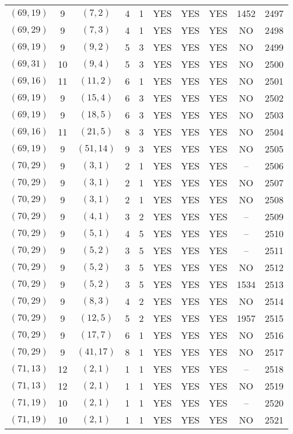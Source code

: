 \begin{longtable}{|c|c|c|c|c|c|c|c|c|c|}
$(69, 19)$ & 9 & $(7, 2)$ & 4 & 1 & YES & YES & YES & 1452 & 2497\\
$(69, 29)$ & 9 & $(7, 3)$ & 4 & 1 & YES & YES & YES & NO & 2498\\
$(69, 19)$ & 9 & $(9, 2)$ & 5 & 3 & YES & YES & YES & NO & 2499\\
$(69, 31)$ & 10 & $(9, 4)$ & 5 & 3 & YES & YES & YES & NO & 2500\\
$(69, 16)$ & 11 & $(11, 2)$ & 6 & 1 & YES & YES & YES & NO & 2501\\
$(69, 19)$ & 9 & $(15, 4)$ & 6 & 3 & YES & YES & YES & NO & 2502\\
$(69, 19)$ & 9 & $(18, 5)$ & 6 & 3 & YES & YES & YES & NO & 2503\\
$(69, 16)$ & 11 & $(21, 5)$ & 8 & 3 & YES & YES & YES & NO & 2504\\
$(69, 19)$ & 9 & $(51, 14)$ & 9 & 3 & YES & YES & YES & NO & 2505\\
$(70, 29)$ & 9 & $(3, 1)$ & 2 & 1 & YES & YES & YES & -- & 2506\\
$(70, 29)$ & 9 & $(3, 1)$ & 2 & 1 & YES & YES & YES & NO & 2507\\
$(70, 29)$ & 9 & $(3, 1)$ & 2 & 1 & YES & YES & YES & NO & 2508\\
$(70, 29)$ & 9 & $(4, 1)$ & 3 & 2 & YES & YES & YES & -- & 2509\\
$(70, 29)$ & 9 & $(5, 1)$ & 4 & 5 & YES & YES & YES & -- & 2510\\
$(70, 29)$ & 9 & $(5, 2)$ & 3 & 5 & YES & YES & YES & -- & 2511\\
$(70, 29)$ & 9 & $(5, 2)$ & 3 & 5 & YES & YES & YES & NO & 2512\\
$(70, 29)$ & 9 & $(5, 2)$ & 3 & 5 & YES & YES & YES & 1534 & 2513\\
$(70, 29)$ & 9 & $(8, 3)$ & 4 & 2 & YES & YES & YES & NO & 2514\\
$(70, 29)$ & 9 & $(12, 5)$ & 5 & 2 & YES & YES & YES & 1957 & 2515\\
$(70, 29)$ & 9 & $(17, 7)$ & 6 & 1 & YES & YES & YES & NO & 2516\\
$(70, 29)$ & 9 & $(41, 17)$ & 8 & 1 & YES & YES & YES & NO & 2517\\
$(71, 13)$ & 12 & $(2, 1)$ & 1 & 1 & YES & YES & YES & -- & 2518\\
$(71, 13)$ & 12 & $(2, 1)$ & 1 & 1 & YES & YES & YES & NO & 2519\\
$(71, 19)$ & 10 & $(2, 1)$ & 1 & 1 & YES & YES & YES & -- & 2520\\
$(71, 19)$ & 10 & $(2, 1)$ & 1 & 1 & YES & YES & YES & NO & 2521\\

\end{longtable}
